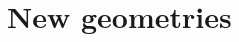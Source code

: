 \documentclass[xcolor=x11names,compress]{beamer}
\renewcommand{\(}{\begin{columns}}
\renewcommand{\)}{\end{columns}}
\newcommand{\<}[1]{\begin{column}{#1}}
\renewcommand{\>}{\end{column}}
\begin{document}


\section{New geometries}
\end{document}
